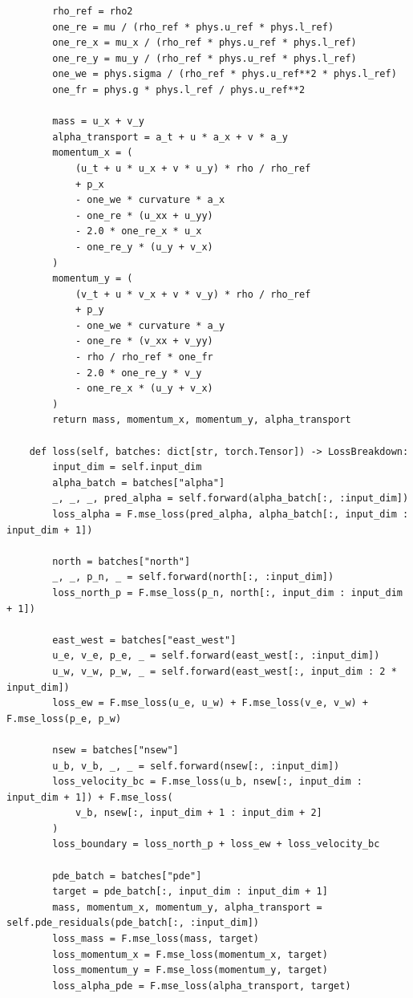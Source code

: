 \begin{lstlisting}
        rho_ref = rho2
        one_re = mu / (rho_ref * phys.u_ref * phys.l_ref)
        one_re_x = mu_x / (rho_ref * phys.u_ref * phys.l_ref)
        one_re_y = mu_y / (rho_ref * phys.u_ref * phys.l_ref)
        one_we = phys.sigma / (rho_ref * phys.u_ref**2 * phys.l_ref)
        one_fr = phys.g * phys.l_ref / phys.u_ref**2

        mass = u_x + v_y
        alpha_transport = a_t + u * a_x + v * a_y
        momentum_x = (
            (u_t + u * u_x + v * u_y) * rho / rho_ref
            + p_x
            - one_we * curvature * a_x
            - one_re * (u_xx + u_yy)
            - 2.0 * one_re_x * u_x
            - one_re_y * (u_y + v_x)
        )
        momentum_y = (
            (v_t + u * v_x + v * v_y) * rho / rho_ref
            + p_y
            - one_we * curvature * a_y
            - one_re * (v_xx + v_yy)
            - rho / rho_ref * one_fr
            - 2.0 * one_re_y * v_y
            - one_re_x * (u_y + v_x)
        )
        return mass, momentum_x, momentum_y, alpha_transport

    def loss(self, batches: dict[str, torch.Tensor]) -> LossBreakdown:
        input_dim = self.input_dim
        alpha_batch = batches["alpha"]
        _, _, _, pred_alpha = self.forward(alpha_batch[:, :input_dim])
        loss_alpha = F.mse_loss(pred_alpha, alpha_batch[:, input_dim : input_dim + 1])

        north = batches["north"]
        _, _, p_n, _ = self.forward(north[:, :input_dim])
        loss_north_p = F.mse_loss(p_n, north[:, input_dim : input_dim + 1])

        east_west = batches["east_west"]
        u_e, v_e, p_e, _ = self.forward(east_west[:, :input_dim])
        u_w, v_w, p_w, _ = self.forward(east_west[:, input_dim : 2 * input_dim])
        loss_ew = F.mse_loss(u_e, u_w) + F.mse_loss(v_e, v_w) + F.mse_loss(p_e, p_w)

        nsew = batches["nsew"]
        u_b, v_b, _, _ = self.forward(nsew[:, :input_dim])
        loss_velocity_bc = F.mse_loss(u_b, nsew[:, input_dim : input_dim + 1]) + F.mse_loss(
            v_b, nsew[:, input_dim + 1 : input_dim + 2]
        )
        loss_boundary = loss_north_p + loss_ew + loss_velocity_bc

        pde_batch = batches["pde"]
        target = pde_batch[:, input_dim : input_dim + 1]
        mass, momentum_x, momentum_y, alpha_transport = self.pde_residuals(pde_batch[:, :input_dim])
        loss_mass = F.mse_loss(mass, target)
        loss_momentum_x = F.mse_loss(momentum_x, target)
        loss_momentum_y = F.mse_loss(momentum_y, target)
        loss_alpha_pde = F.mse_loss(alpha_transport, target)


\end{lstlisting}
